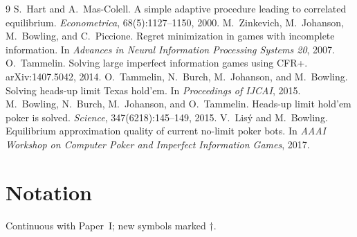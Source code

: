 \documentclass[11pt]{article}
\theoremstyle{plain}
\theoremstyle{definition}
\theoremstyle{remark}
\begin{document}
\begin{thebibliography}{9}\small
{} S.~Hart and A.~Mas-Colell. A simple adaptive
procedure leading to correlated equilibrium. \emph{Econometrica},
68(5):1127--1150, 2000.
 M.~Zinkevich, M.~Johanson, M.~Bowling, and
C.~Piccione. Regret minimization in games with incomplete information.
In \emph{Advances in Neural Information Processing Systems 20}, 2007.
 O.~Tammelin. Solving large imperfect
information games using CFR+. arXiv:1407.5042, 2014.
 O.~Tammelin, N.~Burch, M.~Johanson, and
M.~Bowling. Solving heads-up limit Texas hold'em. In
\emph{Proceedings of IJCAI}, 2015.
 M.~Bowling, N.~Burch, M.~Johanson, and
O.~Tammelin. Heads-up limit hold'em poker is solved. \emph{Science},
347(6218):145--149, 2015.
 V.~Lis\'y and M.~Bowling. Equilibrium approximation
quality of current no-limit poker bots. In \emph{AAAI Workshop on
Computer Poker and Imperfect Information Games}, 2017.
\end{thebibliography}

\appendix

\section{Notation}\label{app:notation}

Continuous with Paper~I; new symbols marked $\dagger$.
\end{document}
